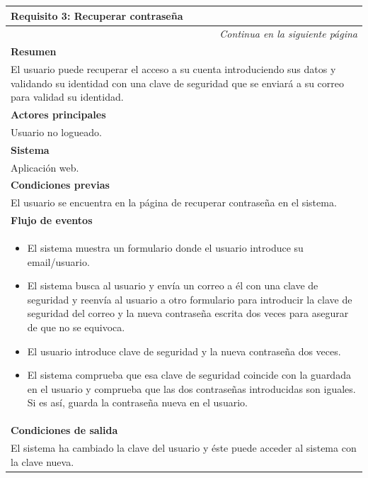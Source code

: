 \begin{longtable}{|p{}|}
\hline
\rowcolor[gray]{.5}
 \color{white}\textbf{Requisito 3: Recuperar contraseña} \\
\hline
\endfirsthead
\endhead
\hline \multicolumn{1}{r}{\textit{Continua en la siguiente página}} \\
\endfoot
\endlastfoot
    \rowcolor[gray]{.9}
     \textbf{Resumen} \\
     \hline
     El usuario puede recuperar el acceso a su cuenta introduciendo sus datos y validando su identidad con una clave de seguridad que se enviará a su correo para validad su identidad. \\
     \hline
     \rowcolor[gray]{.9}
     \textbf{Actores principales} \\
     \hline
     Usuario no logueado. \\
     \hline
     \rowcolor[gray]{.9}
     \textbf{Sistema} \\
     \hline
     Aplicación web. \\
     \hline
     \rowcolor[gray]{.9}
     \textbf{Condiciones previas} \\
     \hline
     El usuario se encuentra en la página de recuperar contraseña en el sistema. \\
     \hline
     \rowcolor[gray]{.9}
     \textbf{Flujo de eventos}  \\
     \hline
      \begin{itemize}
         \item El sistema muestra un formulario donde el usuario introduce su email/usuario.
         \item El sistema busca al usuario y envía un correo a él con una clave de seguridad y reenvía al usuario a otro formulario para introducir la clave de seguridad del correo y la nueva contraseña escrita dos veces para asegurar de que no se equivoca.
         \item El usuario introduce clave de seguridad y la nueva contraseña dos veces.
         \item El sistema comprueba que esa clave de seguridad coincide con la guardada en el usuario y comprueba que las dos contraseñas introducidas son iguales. Si es así, guarda la contraseña nueva en el usuario.
     \end{itemize} \\
     \hline
     \rowcolor[gray]{.9}
     \textbf{Condiciones de salida} \\
     \hline
     El sistema ha cambiado la clave del usuario y éste puede acceder al sistema con la clave nueva. \\

\end{longtable}
